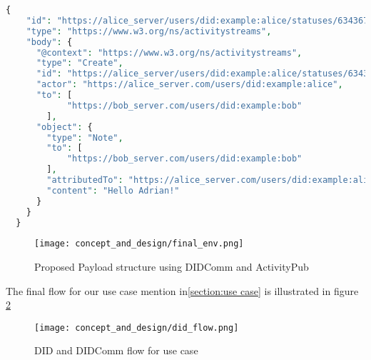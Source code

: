 \lstset{style=JSONStyle}
\begin{lstlisting}[language=PHP, caption=JWM example, label=fig:jwm_example, float=h]
  {
    "id": "https://alice_server/users/did:example:alice/statuses/634367/activity",
    "type": "https://www.w3.org/ns/activitystreams",
    "body": {
      "@context": "https://www.w3.org/ns/activitystreams",
      "type": "Create",
      "id": "https://alice_server/users/did:example:alice/statuses/634367/activity",
      "actor": "https://alice_server.com/users/did:example:alice",
      "to": [ 
            "https://bob_server.com/users/did:example:bob"
        ],
      "object": {
        "type": "Note",
        "to": [ 
            "https://bob_server.com/users/did:example:bob"
        ],
        "attributedTo": "https://alice_server.com/users/did:example:alice",
        "content": "Hello Adrian!"
      }
    }
  }
\end{lstlisting}

\begin{figure}[h]
  \centering
  \texttt{[image: concept\_and\_design/final\_env.png]}
  \caption{Proposed Payload structure using DIDComm and ActivityPub}
  \label{fig:final_env}
\end{figure}

The final flow for our use case mention in\ref{section:use case} is illustrated in figure \ref{fig:did_flow}

\begin{figure}[h]
  \centering
  \texttt{[image: concept\_and\_design/did\_flow.png]}
  \caption{DID and DIDComm flow for use case}
  \label{fig:did_flow}
\end{figure}



%








